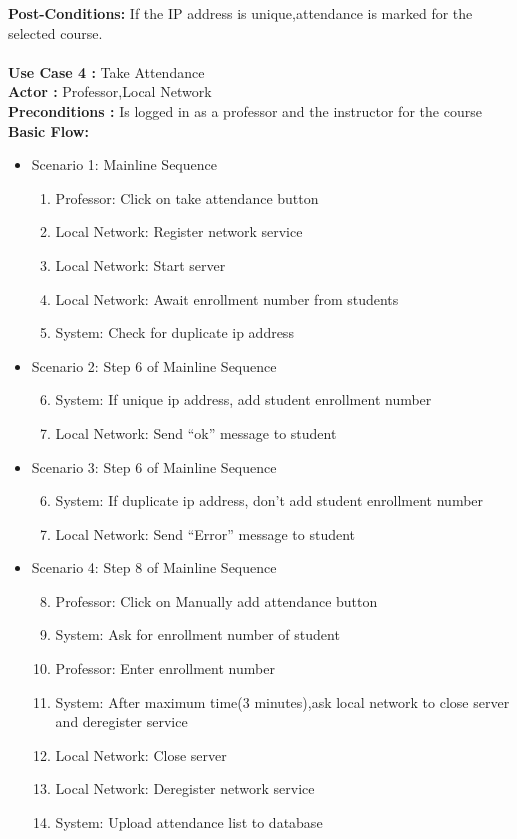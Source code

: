 \documentclass{article}
\begin{document}
\textbf{Post-Conditions:} If the IP address is unique,attendance is marked for the selected course.\\ \\
\textbf{Use Case 4 : }Take Attendance\\
\textbf{Actor : }Professor,Local Network\\
\textbf{Preconditions : }Is logged in as a professor and the instructor for the course\\
\textbf{Basic Flow: }
\begin{itemize}
\item Scenario 1: Mainline Sequence
	\begin{enumerate}
		\item Professor: Click on take attendance button
\item Local Network: Register network service
\item Local Network: Start server
\item Local Network: Await enrollment number from students
\item System: Check for duplicate ip address 
	\end{enumerate}
\item Scenario 2: Step 6 of Mainline Sequence
	\begin{enumerate}
		\setcounter{enumi}{5}
		\item System: If unique ip address, add student enrollment number
		\item Local Network: Send “ok” message to student
	\end{enumerate}
	\item Scenario 3: Step 6 of Mainline Sequence
	\begin{enumerate}
		\setcounter{enumi}{5}
		\item System: If duplicate ip address, don’t add student enrollment number
		\item Local Network: Send “Error” message to student
	\end{enumerate}
	\item Scenario 4: Step 8 of Mainline Sequence
		\begin{enumerate}
			\setcounter{enumi}{7}
			\item Professor: Click on Manually add attendance button
			\item System: Ask for enrollment number of student
			\item Professor: Enter enrollment number
			\item System: After maximum time(3 minutes),ask local network to close server and deregister service
			\item Local Network: Close server
			\item Local Network: Deregister network service
			\item System: Upload attendance list to database
		\end{enumerate}
\end{itemize}
\end{document}
